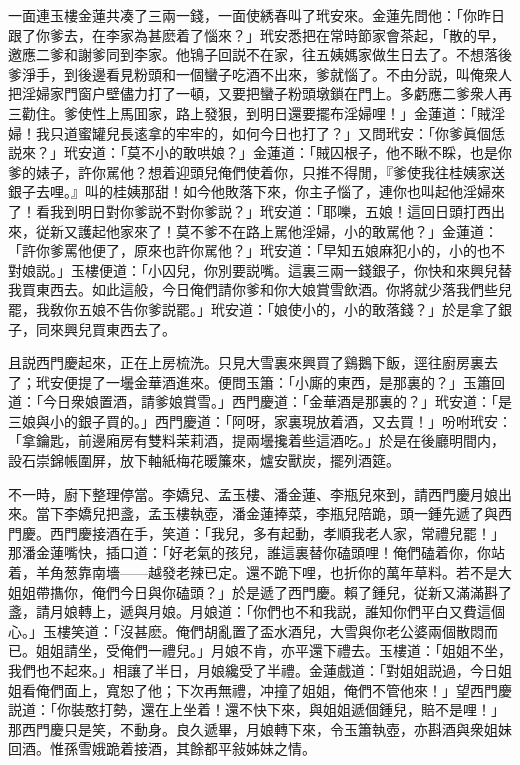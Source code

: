 一面連玉樓金蓮共凑了三兩一錢，一面使綉春叫了玳安來。金蓮先問他：「你昨日跟了你爹去，在李家為甚麽着了惱來？」玳安悉把在常時節家會茶起，「散的早，邀應二爹和謝爹同到李家。他鴇子回説不在家，往五姨媽家做生日去了。不想落後爹淨手，到後邊看見粉頭和一個蠻子吃酒不出來，爹就惱了。不由分説，叫俺衆人把淫婦家門窗户壁儘力打了一頓，又要把蠻子粉頭墩鎖在門上。多虧應二爹衆人再三勸住。爹使性上馬囬家，路上發狠，到明日還要擺布淫婦哩！」金蓮道：「賊淫婦！我只道蜜罐兒長逺拿的牢牢的，如何今日也打了？」又問玳安：「你爹眞個恁説來？」玳安道：「莫不小的敢哄娘？」金蓮道：「賊囚根子，他不瞅不睬，也是你爹的婊子，許你駡他？想着迎頭兒俺們使着你，只推不得閒，『爹使我往桂姨家送銀子去哩。』叫的桂姨那甜！如今他敗落下來，你主子惱了，連你也叫起他淫婦來了！看我到明日對你爹説不對你爹説？」玳安道：「耶嚛，五娘！這回日頭打西出來，従新又護起他家來了！莫不爹不在路上駡他淫婦，小的敢駡他？」金蓮道：「許你爹罵他便了，原來也許你駡他？」玳安道：「早知五娘麻犯小的，小的也不對娘説。」玉樓便道：「小囚兒，你別要説嘴。這裏三兩一錢銀子，你快和來興兒替我買東西去。如此這般，今日俺們請你爹和你大娘賞雪飲酒。你將就少落我們些兒罷，我敎你五娘不告你爹説罷。」玳安道：「娘使小的，小的敢落錢？」於是拿了銀子，同來興兒買東西去了。

且説西門慶起來，正在上房梳洗。只見大雪裏來興買了鷄鵝下飯，逕往廚房裏去了；玳安便提了一壜金華酒進來。便問玉簫：「小廝的東西，是那裏的？」玉簫回道：「今日衆娘置酒，請爹娘賞雪。」西門慶道：「金華酒是那裏的？」玳安道：「是三娘與小的銀子買的。」西門慶道：「阿呀，家裏現放着酒，又去買！」吩咐玳安：「拿鑰匙，前邊廂房有雙料茉莉酒，提兩壜攙着些這酒吃。」於是在後廳明間内，設石崇錦帳圍屏，放下軸紙梅花暖簾來，爐安獸炭，擺列酒筵。

不一時，廚下整理停當。李嬌兒、孟玉樓、潘金蓮、李瓶兒來到，請西門慶月娘出來。當下李嬌兒把盞，孟玉樓執壺，潘金蓮捧菜，李瓶兒陪跪，頭一鍾先遞了與西門慶。西門慶接酒在手，笑道：「我兒，多有起動，孝順我老人家，常禮兒罷！」那潘金蓮嘴快，插口道：「好老氣的孩兒，誰這裏替你磕頭哩！俺們磕着你，你站着，羊角葱靠南墻——越發老辣已定。還不跪下哩，也折你的萬年草料。若不是大姐姐帶㩦你，俺們今日與你磕頭？」於是遞了西門慶。賴了鍾兒，従新又滿滿斟了盞，請月娘轉上，遞與月娘。月娘道：「你們也不和我説，誰知你們平白又費這個心。」玉樓笑道：「沒甚麽。俺們胡亂置了盃水酒兒，大雪與你老公婆兩個散悶而已。姐姐請坐，受俺們一禮兒。」月娘不肯，亦平還下禮去。玉樓道：「姐姐不坐，我們也不起來。」相讓了半日，月娘纔受了半禮。金蓮戲道：「對姐姐説過，今日姐姐看俺們面上，寬恕了他；下次再無禮，冲撞了姐姐，俺們不管他來！」望西門慶説道：「你裝憨打勢，還在上坐着！還不快下來，與姐姐遞個鍾兒，賠不是哩！」那西門慶只是笑，不動身。良久遞畢，月娘轉下來，令玉簫執壺，亦斟酒與衆姐妹回酒。惟孫雪娥跪着接酒，其餘都平敍姊妹之情。

